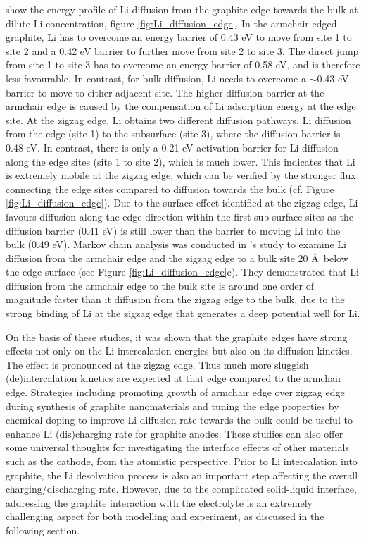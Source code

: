 \documentclass[../main.tex]{subfiles}
\begin{document}
\citeauthor{peng2020lithium} show the energy profile of Li diffusion from the graphite edge towards the bulk at dilute Li concentration, figure \ref{fig:Li_diffusion_edge}. In the armchair-edged graphite, Li has to overcome an energy barrier of 0.43 eV to move from site 1 to site 2 and a 0.42 eV barrier to further move from site 2 to site 3. The direct jump from site 1 to site 3 has to overcome an energy barrier of 0.58 eV, and is therefore less favourable. In contrast, for bulk diffusion, Li needs to overcome a $\sim$0.43 eV barrier to move to either adjacent site. The higher diffusion barrier at the armchair edge is caused by the compensation of Li adsorption energy at the edge site. At the zigzag edge, Li obtains two different diffusion pathways. Li diffusion from the edge (site 1) to the subsurface (site 3), where the diffusion barrier is 0.48 eV. In contrast, there is only a 0.21 eV activation barrier for Li diffusion along the edge sites (site 1 to site 2), which is much lower. This indicates that Li is extremely mobile at the zigzag edge, which can be verified by the stronger flux connecting the edge sites compared to diffusion towards the bulk (cf. Figure \ref{fig:Li_diffusion_edge}). Due to the surface effect identified at the zigzag edge, Li favours diffusion along the edge direction within the first sub-surface sites as the diffusion barrier (0.41 eV) is still  lower than the barrier to moving Li into the bulk (0.49 eV). Markov chain analysis was conducted in \citeauthor{peng2020lithium}'s study to examine Li diffusion from the armchair edge and the zigzag edge to a bulk site 20 \AA \ below the edge surface (see Figure \ref{fig:Li_diffusion_edge}c). They demonstrated that Li diffusion from the armchair edge to the bulk site is around one order of magnitude faster than it diffusion from the zigzag edge to the bulk, due to the strong binding of Li at the zigzag edge that generates a deep potential well for Li.\cite{peng2020lithium}

On the basis of these studies, it was shown that the graphite edges have strong effects not only on the Li intercalation energies but also on its diffusion kinetics.\cite{leggesse2016lithium,peng2020lithium} The effect is pronounced at the zigzag edge.\cite{bernardo2015influence,velicky2019electrochemistry,gerischer1985interpretation} Thus much more sluggish (de)intercalation kinetics are expected at that edge compared to the armchair edge. Strategies including promoting growth of armchair edge over zigzag edge during synthesis of graphite nanomaterials and tuning the edge properties by chemical doping to improve Li diffusion rate towards the bulk could be useful to enhance Li (dis)charging rate for graphite anodes.\cite{weydanz1994behavior,way1994effect,endo2001scanning} These studies can also offer some universal thoughts for investigating the interface effects of other materials such as the cathode, from the atomistic perspective. Prior to Li intercalation into graphite, the Li desolvation process is also an important step affecting the overall charging/discharging rate. However, due to the complicated solid-liquid interface, addressing the graphite interaction with the electrolyte is an extremely challenging aspect for both modelling and experiment, as discussed in the following section.
\end{document}

